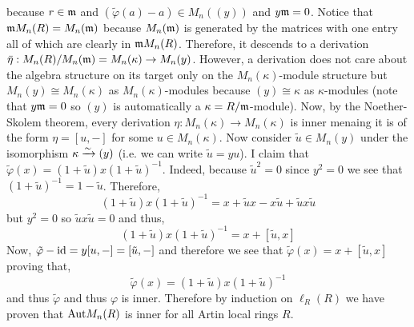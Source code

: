 \documentclass[12pt]{article}
\begin{document}
\begin{enumerate}
because $r \in \mathfrak{m}$ and $(\tilde{\varphi}(a) - a) \in M_n((y))$ and $y \mathfrak{m} = 0$. Notice that $\mathfrak{m} M_n(R) = M_n(\mathfrak{m})$ because $M_n(\mathfrak{m})$ is generated by the matrices with one entry all of which are clearly in $\mathfrak{m} M_n(R)$. Therefore, it descends to a derivation $\bar{\eta} : M_n(R)/M_n(\mathfrak{m}) = M_n(\kappa) \to M_n(y)$. However, a derivation does not care about the algebra structure on its target only on the $M_n(\kappa)$-module structure but $M_n(y) \cong M_n(\kappa)$ as $M_n(\kappa)$-modules because $(y) \cong \kappa$ as $\kappa$-modules (note that $y \mathfrak{m} = 0$ so $(y)$ is automatically a $\kappa = R / \mathfrak{m}$-module). Now, by the Noether-Skolem theorem, every derivation $\eta : M_n(\kappa) \to M_n(\kappa)$ is inner menaing it is of the form $\eta = [u, -]$ for some $u \in M_n(\kappa)$. Now consider $\tilde{u} \in M_n(y)$ under the isomorphism $\kappa \xrightarrow{\sim} (y)$ (i.e. we can write $\tilde{u} = y u$). I claim that $\tilde{\varphi}(x) = (1 + \tilde{u}) x (1 + \tilde{u})^{-1}$. Indeed, because $\tilde{u}^2 = 0$ since $y^2 = 0$ we see that $(1 + \tilde{u})^{-1} = 1 - \tilde{u}$. Therefore,
\[ (1 + \tilde{u}) x (1 + \tilde{u})^{-1} = x + \tilde{u} x - x \tilde{u} + \tilde{u} x \tilde{u} \]
but $y^2 = 0$ so $\tilde{u} x \tilde{u} = 0$ and thus,
\[ (1 + \tilde{u}) x (1 + \tilde{u})^{-1} = x + [\tilde{u}, x] \]
Now, $\tilde{\varphi} - \mathrm{id} = y [u, -] = [\tilde{u}, -]$ and therefore we see that $\tilde{\varphi}(x) = x + [\tilde{u}, x]$ proving that,
\[ \tilde{\varphi}(x) = (1 + \tilde{u}) x (1 + \tilde{u})^{-1} \]
and thus $\tilde{\varphi}$ and thus $\varphi$ is inner. Therefore by induction on $\ell_R(R)$ we have proven that $\mathrm{Aut}{M_n(R)}$ is inner for all Artin local rings $R$.


\end{enumerate}
\end{document}
